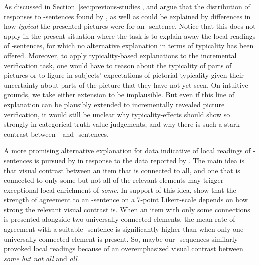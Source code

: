 \documentclass[fleqn,reqno,10pt]{article}
\newcommand{\as}{\acro{as}}
\renewcommand{\es}{\acro{es}}
\begin{document}
As discussed in Section~\ref{sec:previous-studies},
\citet{Tielvan-Tiel2012:Embedded-Scalar} and
\citet{GeurtsTielvan-Tiel2013:Embedded-Scalar} argue that the
distribution of responses to \as-sentences found by
\citet{CliftonDube2010:Embedded-Implic}, as well as
\citet{ChemlaSpector2010:Experimental-Ev} could be explained by
differences in how \emph{typical} the presented pictures were for an
\as-sentence. Notice that this does not apply in the present situation
where the task is to explain away the local readings of \es-sentences,
for which no alternative explanation in terms of typicality has been
offered. Moreover, to apply typicality-based explanations to the
incremental verification task, one would have to reason about the
typicality of parts of pictures or to figure in subjects' expectations
of pictorial typicality given their uncertainty about parts of the
picture that they have not yet seen. On intuitive grounds, we take
either extension to be implausible. But even if this line of
explanation can be plausibly extended to incrementally revealed
picture verification, it would still be unclear why typicality-effects
should show so strongly in categorical truth-value judgements, and why
there is such a stark contrast between \as- and \es-sentences.

A more promising alternative explanation for data indicative of local
readings of \es-sentences is pursued by
\citet{GeurtsTielvan-Tiel2013:Embedded-Scalar} in response to the data
reported by \citet{ChemlaSpector2010:Experimental-Ev}. The main idea
is that visual contrast between an item that is connected to all, and
one that is connected to only some but not all of the relevant
elements may trigger exceptional local enrichment of \emph{some}. In
support of this idea,
\citeauthor{GeurtsTielvan-Tiel2013:Embedded-Scalar} show that the
strength of agreement to an \es-sentence on a 7-point Likert-scale
depends on how strong the relevant visual contrast is. When an item
with only some connections is presented alongside two universally
connected elements, the mean rate of agreement with a suitable
\es-sentence is significantly higher than when only one universally
connected element is present. So, maybe our \es-sequences similarly
provoked local readings because of an overemphasized visual contrast
between \emph{some but not all} and \emph{all}.
\end{document}
